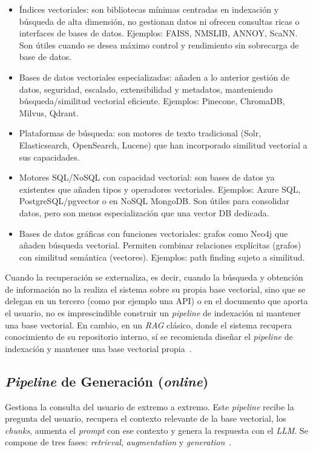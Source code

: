 \begin{itemize}
	\begin{itemize}
		\item Índices vectoriales: son bibliotecas mínimas centradas en indexación y búsqueda de alta dimensión, no gestionan datos ni ofrecen consultas ricas o interfaces de bases de datos. Ejemplos: FAISS, NMSLIB, ANNOY, ScaNN. Son útiles cuando se desea máximo control y rendimiento sin sobrecarga de base de datos.
		\item Bases de datos vectoriales especializadas: añaden a lo anterior gestión de datos, seguridad, escalado, extensibilidad y metadatos, manteniendo búsqueda/similitud vectorial eficiente. Ejemplos: Pinecone, ChromaDB, Milvus, Qdrant.
		\item Plataformas de búsqueda: son motores de texto tradicional (Solr, Elasticsearch, OpenSearch, Lucene) que han incorporado similitud vectorial a sus capacidades.
		\item Motores SQL/NoSQL con capacidad vectorial: son bases de datos ya existentes que añaden tipos y operadores vectoriales. Ejemplos: Azure SQL, PostgreSQL/pgvector o en NoSQL MongoDB. Son útiles para consolidar datos, pero son menos especialización que una vector DB dedicada.
		\item Bases de datos gráficas con funciones vectoriales: grafos como Neo4j que añaden búsqueda vectorial. Permiten combinar relaciones explícitas (grafos) con similitud semántica (vectores). Ejemplos: path finding sujeto a similitud.
	\end{itemize}
\end{itemize} 

Cuando la recuperación se externaliza, es decir, cuando la búsqueda y obtención de información no la realiza el sistema sobre su propia base vectorial, sino que se delegan en un tercero (como por ejemplo una API) o en el documento que aporta el usuario, no es imprescindible construir un \textit{pipeline} de indexación ni mantener una base vectorial. En cambio, en un \textit{RAG} clásico, donde el sistema recupera conocimiento de su repositorio interno, sí se recomienda diseñar el \textit{pipeline} de indexación y mantener una base vectorial propia~\cite{book:RAG_SimpleGuide}.

\subsection{\textit{Pipeline} de Generación (\textit{online})}
Gestiona la consulta del usuario de extremo a extremo. Este \textit{pipeline} recibe la pregunta del usuario, recupera el contexto relevante de la base vectorial, los \textit{chunks}, aumenta el \textit{prompt} con ese contexto y genera la respuesta con el \textit{LLM}. Se compone de tres fases: \textit{retrieval}, \textit{augmentation} y \textit{generation}~\cite{book:RAG_SimpleGuide}. 


